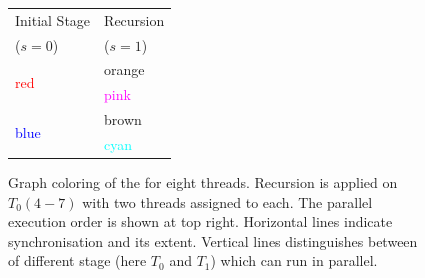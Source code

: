 \begin{figure}[thbp]
\begin{minipage}[c]{0.4\textwidth}
	       	\begin{tabular}{l|l}
	       		{Initial Stage} & {Recursion}\\
	       		{($s=0$)} & {($s=1$)}\\
	       		\midrule
	       	   \multirow{2}{*}{\textcolor{red}{red}} & {\textcolor{amber}{orange}}\\
	       	   \cmidrule(lr){2-2}
	       		& {\textcolor{magenta}{pink}}\\
	       		\midrule
	       	   \multirow{2}{*}{\textcolor{blue}{blue}} & {\textcolor{carmine}{brown}}\\
	       	   \cmidrule(lr){2-2}
	       	   & {\textcolor{cyan}{cyan}}\\
	       	   \bottomrule
	       	\end{tabular}
       		\caption{Graph coloring of the \stex for eight threads. Recursion is applied on \levelGroups $T_0(4-7)$ with two threads assigned to each. The parallel execution order is shown at top right.  Horizontal lines indicate synchronisation and its extent. Vertical lines distinguishes between \levelGroups of different stage (here $T_0$ and $T_1$) which can run in parallel. 
		}
       		\label{fig:rec_2d-7pt_graph}
       	\end{minipage}
       \end{figure}
     
          
